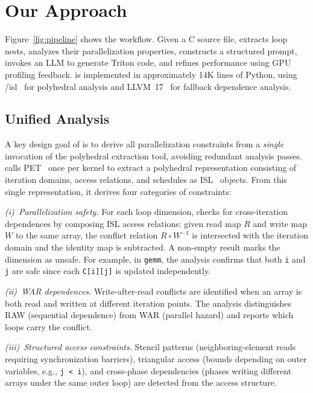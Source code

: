 \section{Our Approach}
\label{sec:method}


Figure~\ref{fig:pipeline} shows the \sysname workflow.
Given a C source file, \sysname extracts loop nests, analyzes their parallelization properties, constructs a structured prompt, invokes an LLM to generate Triton code, and refines performance using GPU profiling feedback.
\sysname is implemented in approximately 14K lines of Python, using \pet/isl~\cite{verdoolaege2010isl} for polyhedral analysis and LLVM~17~\cite{llvm} for fallback dependence analysis.

\subsection{Unified Analysis}
A key design goal of \sysname is to derive all parallelization constraints from a \emph{single} invocation of the polyhedral extraction tool, avoiding redundant analysis passes.
\sysname calls PET~\cite{verdoolaege2012polyhedral} once per kernel to extract a polyhedral representation consisting of iteration domains, access relations, and schedules as ISL~\cite{verdoolaege2010isl} objects. From this single representation, it derives four categories of constraints:

\emph{(i)~Parallelization safety.}
For each loop dimension, \sysname checks for cross-iteration dependences by composing ISL access relations: given read map $R$ and write map $W$ to the same array, the conflict relation $R \circ W^{-1}$ is intersected with the iteration domain and the identity map is subtracted. A non-empty result marks the dimension as unsafe.
For example, in \texttt{gemm}, the analysis confirms that both \texttt{i} and \texttt{j} are safe since each \texttt{C[i][j]} is updated independently.

\emph{(ii)~WAR dependences.}
Write-after-read conflicts are identified when an array is both read and written at different iteration points. The analysis distinguishes RAW (sequential dependence) from WAR (parallel hazard) and reports which loops carry the conflict.

\emph{(iii)~Structured access constraints.}
Stencil patterns (neighboring-element reads requiring synchronization barriers), triangular access (bounds depending on outer variables, e.g., \texttt{j < i}), and cross-phase dependencies (phases writing different arrays under the same outer loop) are detected from the access structure.

